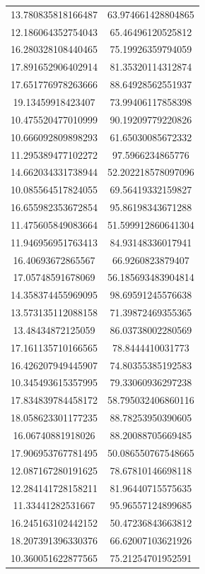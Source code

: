\begin{table}
\begin{tabular}{cc}
13.780835818166487 & 63.974661428804865 \\
12.186064352754043 & 65.46496120525812 \\
16.280328108440465 & 75.19926359794059 \\
17.891652906402914 & 81.35320114312874 \\
17.651776978263666 & 88.64928562551937 \\
19.13459918423407 & 73.99406117858398 \\
10.475520477010999 & 90.19209779220826 \\
10.666092809898293 & 61.65030085672332 \\
11.295389477102272 & 97.5966234865776 \\
14.662034331738944 & 52.202218578097096 \\
10.085564517824055 & 69.56419332159827 \\
16.655982353672854 & 95.86198343671288 \\
11.475605849083664 & 51.599912860641304 \\
11.946956951763413 & 84.93148336017941 \\
16.40693672865567 & 66.9260823879407 \\
17.05748591678069 & 56.185693483904814 \\
14.358374455969095 & 98.69591245576638 \\
13.573135112088158 & 71.39872469355365 \\
13.48434872125059 & 86.03738002280569 \\
17.161135710166565 & 78.8444410031773 \\
16.426207949445907 & 74.80355385192583 \\
10.345493615357995 & 79.33060936297238 \\
17.834839784458172 & 58.795032406860116 \\
18.058623301177235 & 88.78253950390605 \\
16.06740881918026 & 88.20088705669485 \\
17.906953767781495 & 50.086550767548665 \\
12.087167280191625 & 78.67810146698118 \\
12.284141728158211 & 81.96440715575635 \\
11.33441282531667 & 95.96557124899685 \\
16.245163102442152 & 50.47236843663812 \\
18.207391396330376 & 66.62007103621926 \\
10.360051622877565 & 75.21254701952591 \\

\end{tabular}
\end{table}
